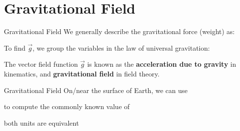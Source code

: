 \documentclass[12pt,compress,aspectratio=169]{beamer}
\begin{document}
\section{Gravitational Field}

\begin{frame}{Gravitational Field}
  We generally describe the gravitational force (weight) as:
  

  To find $\vec g$, we group the variables in the law of universal gravitation:
    

  The vector field function $\vec g$ is known as the
  \textbf{acceleration due to gravity} in kinematics, and
  \textbf{gravitational field} in field theory.
\end{frame}



\begin{frame}{Gravitational Field}
  On/near the surface of Earth, we can use

  
  \vspace{-.2in}to compute the commonly known value of


  \vspace{-.3in}both units are equivalent
\end{frame}
\end{document}
